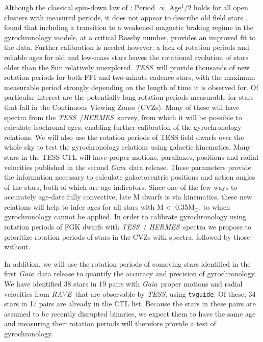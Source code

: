 \documentclass[letterpaper,12pt,preprint]{hack_aastex}
\newcommand{\Kepler}{{\it Kepler}}
\newcommand{\kepler}{\Kepler}
\newcommand{\TESS}{{\it TESS}}
\newcommand{\tess}{{\it TESS}}
\newcommand{\Gaia}{{\it Gaia}}
\newcommand{\RAVE}{{\it RAVE}}
\newcommand{\hermes}{{\it HERMES}}
\newcommand{\HERMES}{{\it HERMES}}
\begin{document}
Although the classical spin-down law of \citet{skumanich1972}: Period
$\propto$ Age$^1/2$ holds for all open clusters with measured periods, it does
not appear to describe old field stars \citep{angus2015, van-saders2016}.
\citet{van-saders2016} found that including a transition to a weakened magnetic
braking regime in the gyrochronology models, at a critical Rossby number,
provides an improved fit to the data.
Further calibration is needed however; a lack of rotation periods and reliable
ages for old and low-mass stars leaves the rotational evolution of stars older
than the Sun relatively unexplored.
\TESS\ will provide thousands of new rotation periods for both FFI and
two-minute cadence stars, with the maximum measurable period strongly
depending on the length of time it is observed for.
Of particular interest are the potentially long rotation periods measurable
for stars that fall in the Continuous Viewing Zones (CVZs).
Many of these will have spectra from the \TESS\ /\HERMES\ survey, from which it
will be possible to calculate isochronal ages, enabling further calibration of
the gyrochronology relations.
We will also use the rotation periods of TESS field dwarfs over the whole sky
to test the gyrochronology relations using galactic kinematics.
Many stars in the TESS CTL will have proper motions, parallaxes, positions and
radial velocities published in the second \Gaia\ data release.
These parameters provide the information necessary to calculate galactocentric
positions and action angles of the stars, both of which are age indicators.
Since one of the few ways to accurately age-date fully convective, late M
dwarfs is via kinematics, these new relations will help to infer ages for all
stars with M$<$ 0.35M$_\odot$, to which gyrochronology cannot be applied.
In order to calibrate gyrochronology using rotation periods of FGK dwarfs with
\tess\ / \hermes\ spectra we propose to prioritize rotation periods of stars
in the CVZs with spectra, followed by those without.

In addition, we will use the rotation periods of comoving stars identified in
the first \Gaia\ data release \citep{oh2016} to quantify the accuracy and
precision of gyrochronology.
We have identified 38 stars in 19 pairs with \Gaia\ proper motions and radial
velocities from \RAVE\ that are observable by \TESS, using {\tt tvguide}.
Of these, 34 stars in 17 pairs are already in the CTL list.
Because the stars in these pairs are assumed to be recently disrupted
binaries, we expect them to have the same age and measuring their rotation
periods will therefore provide a test of gyrochronology.
\end{document}
